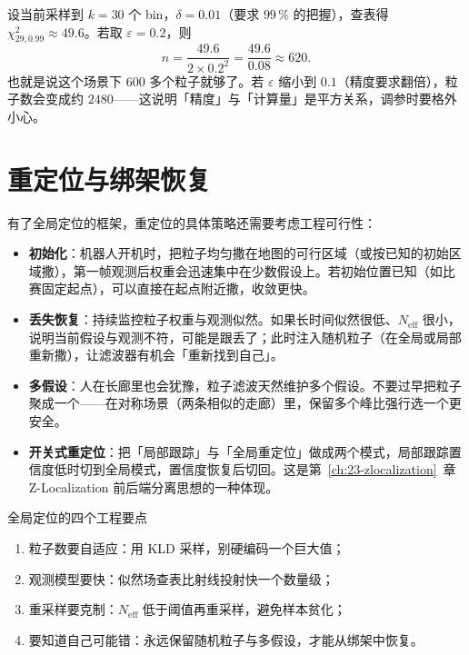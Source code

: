 \begin{example}
设当前采样到 $k=30$ 个 bin，$\delta=0.01$（要求 $99\,\%$ 的把握），查表得 $\chi^{2}_{29,0.99}\approx49.6$。若取 $\varepsilon=0.2$，则
\begin{equation}
  n=\frac{49.6}{2\times0.2^{2}}=\frac{49.6}{0.08}\approx620.
\end{equation}
也就是说这个场景下 $600$ 多个粒子就够了。若 $\varepsilon$ 缩小到 $0.1$（精度要求翻倍），粒子数会变成约 $2480$——这说明「精度」与「计算量」是平方关系，调参时要格外小心。
\end{example}

\section{重定位与绑架恢复}\label{sec:10-relocal}

有了全局定位的框架，重定位的具体策略还需要考虑工程可行性：

\begin{itemize}
  \item \textbf{初始化}：机器人开机时，把粒子均匀撒在地图的可行区域（或按已知的初始区域撒），第一帧观测后权重会迅速集中在少数假设上。若初始位置已知（如比赛固定起点），可以直接在起点附近撒，收敛更快。
  \item \textbf{丢失恢复}：持续监控粒子权重与观测似然。如果长时间似然很低、$N_{\text{eff}}$ 很小，说明当前假设与观测不符，可能是跟丢了；此时注入随机粒子（在全局或局部重新撒），让滤波器有机会「重新找到自己」。
  \item \textbf{多假设}：人在长廊里也会犹豫，粒子滤波天然维护多个假设。不要过早把粒子聚成一个——在对称场景（两条相似的走廊）里，保留多个峰比强行选一个更安全。
  \item \textbf{开关式重定位}：把「局部跟踪」与「全局重定位」做成两个模式，局部跟踪置信度低时切到全局模式，置信度恢复后切回。这是第~\ref{ch:23-zlocalization}~章 Z-Localization 前后端分离思想的一种体现。
\end{itemize}

\begin{keybox}{全局定位的四个工程要点}
\begin{enumerate}
  \item 粒子数要自适应：用 KLD 采样，别硬编码一个巨大值；
  \item 观测模型要快：似然场查表比射线投射快一个数量级；
  \item 重采样要克制：$N_{\text{eff}}$ 低于阈值再重采样，避免样本贫化；
  \item 要知道自己可能错：永远保留随机粒子与多假设，才能从绑架中恢复。
\end{enumerate}
\end{keybox}

